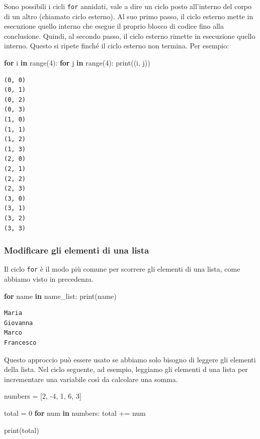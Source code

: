 \documentclass[
  letterpaper,
  krantz2]{{[}./krantz{]}}
\newenvironment{Shaded}{\begin{snugshade}}{\end{snugshade}}
\newcommand{\BuiltInTok}[1]{\textcolor[rgb]{0.00,0.23,0.31}{#1}}
\newcommand{\ControlFlowTok}[1]{\textcolor[rgb]{0.00,0.23,0.31}{\textbf{#1}}}
\newcommand{\DecValTok}[1]{\textcolor[rgb]{0.68,0.00,0.00}{#1}}
\newcommand{\KeywordTok}[1]{\textcolor[rgb]{0.00,0.23,0.31}{\textbf{#1}}}
\newcommand{\NormalTok}[1]{\textcolor[rgb]{0.00,0.23,0.31}{#1}}
\newcommand{\OperatorTok}[1]{\textcolor[rgb]{0.37,0.37,0.37}{#1}}
\begin{document}
Sono possibili i cicli \texttt{for} annidati, vale a dire un ciclo posto
all'interno del corpo di un altro (chiamato ciclo esterno). Al suo primo
passo, il ciclo esterno mette in esecuzione quello interno che esegue il
proprio blocco di codice fino alla conclusione. Quindi, al secondo
passo, il ciclo esterno rimette in esecuzione quello interno. Questo si
ripete finché il ciclo esterno non termina. Per esempio:

\begin{Shaded}
\begin{Highlighting}[]
\ControlFlowTok{for}\NormalTok{ i }\KeywordTok{in} \BuiltInTok{range}\NormalTok{(}\DecValTok{4}\NormalTok{):}
    \ControlFlowTok{for}\NormalTok{ j }\KeywordTok{in} \BuiltInTok{range}\NormalTok{(}\DecValTok{4}\NormalTok{):}
        \BuiltInTok{print}\NormalTok{((i, j))}
\end{Highlighting}
\end{Shaded}

\begin{verbatim}
(0, 0)
(0, 1)
(0, 2)
(0, 3)
(1, 0)
(1, 1)
(1, 2)
(1, 3)
(2, 0)
(2, 1)
(2, 2)
(2, 3)
(3, 0)
(3, 1)
(3, 2)
(3, 3)
\end{verbatim}

\subsubsection{Modificare gli elementi di una
lista}\label{modificare-gli-elementi-di-una-lista}

Il ciclo \texttt{for} è il modo più comune per scorrere gli elementi di
una lista, come abbiamo visto in precedenza.

\begin{Shaded}
\begin{Highlighting}[]
\ControlFlowTok{for}\NormalTok{ name }\KeywordTok{in}\NormalTok{ name\_list:}
    \BuiltInTok{print}\NormalTok{(name)}
\end{Highlighting}
\end{Shaded}

\begin{verbatim}
Maria
Giovanna
Marco
Francesco
\end{verbatim}

Questo approccio può essere usato se abbiamo solo bisogno di leggere gli
elementi della lista. Nel ciclo seguente, ad esempio, leggiamo gli
elementi d una lista per incrementare una variabile così da calcolare
una somma.

\begin{Shaded}
\begin{Highlighting}[]
\NormalTok{numbers }\OperatorTok{=}\NormalTok{ [}\DecValTok{2}\NormalTok{, }\OperatorTok{{-}}\DecValTok{4}\NormalTok{, }\DecValTok{1}\NormalTok{, }\DecValTok{6}\NormalTok{, }\DecValTok{3}\NormalTok{]}

\NormalTok{total }\OperatorTok{=} \DecValTok{0}
\ControlFlowTok{for}\NormalTok{ num }\KeywordTok{in}\NormalTok{ numbers:}
\NormalTok{    total }\OperatorTok{+=}\NormalTok{ num}

\BuiltInTok{print}\NormalTok{(total)}
\end{Highlighting}
\end{Shaded}
\end{document}
